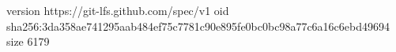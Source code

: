 version https://git-lfs.github.com/spec/v1
oid sha256:3da358ae741295aab484ef75c7781c90e895fe0bc0bc98a77c6a16c6ebd49694
size 6179
